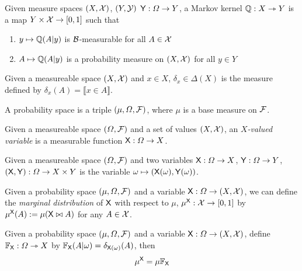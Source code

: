 \begin{definition}
Given measure spaces $(X,\mathcal{X})$, $(Y,\mathcal{Y})$ $\mathsf{Y}:\Omega\to Y$, a Markov kernel $\mathbb{Q}:X\rightarrowtriangle Y$ is a map $Y\times \mathcal{X}\to [0,1]$ such that
\begin{enumerate}
	\item $y\mapsto \mathbb{Q}(A|y)$ is $\mathcal{B}$-measurable for all $A\in \mathcal{X}$
	\item $A\mapsto \mathbb{Q}(A|y)$ is a probability measure on $(X,\mathcal{X})$ for all $y\in Y$
\end{enumerate}
\end{definition}

\begin{definition}
Given a measureable space $(X,\mathcal{X})$ and $x\in X$, $\delta_x\in \Delta(X)$ is the measure defined by $\delta_x(A)=\llbracket x\in A \rrbracket$.
\end{definition}

\begin{definition}
A probability space is a triple $(\mu,\Omega,\mathcal{F})$, where $\mu$ is a base measure on $\mathcal{F}$.
\end{definition}

\begin{definition}[Variable]
Given a measureable space $(\Omega,\mathcal{F})$ and a set of values $(X,\mathcal{X})$, an \emph{$X$-valued variable} is a measurable function $\mathsf{X}:\Omega\to X$.
\end{definition}

\begin{definition}
Given a measureable space $(\Omega,\mathcal{F})$ and two variables $\mathsf{X}:\Omega\to X$, $\mathsf{Y}:\Omega\to Y$, $(\mathsf{X},\mathsf{Y}):\Omega\to X\times Y$ is the variable $\omega\mapsto (\mathsf{X}(\omega),\mathsf{Y}(\omega))$.
\end{definition}

\begin{definition}\label{def:pushforward}
Given a probability space $(\mu,\Omega,\mathcal{F})$ and a variable $\mathsf{X}:\Omega\to (X,\mathcal{X})$, we can define the \emph{marginal distribution} of $\mathsf{X}$ with respect to $\mu$, $\mu^{\mathsf{X}}:\mathcal{X}\to [0,1]$ by $\mu^{\mathsf{X}}(A):=\mu(\mathsf{X}\bowtie A)$ for any $A\in \mathcal{X}$.
\end{definition}

\begin{lemma}\label{lem:pushf_kprod}
Given a probability space $(\mu,\Omega,\mathcal{F})$ and a variable $\mathsf{X}:\Omega\to (X,\mathcal{X})$, define $\mathbb{F}_{\mathsf{X}}:\Omega\rightarrowtriangle X$ by $\mathbb{F}_{\mathsf{X}}(A|\omega)=\delta_{\mathsf{X}(\omega)}(A)$, then
\begin{align}
	\mu^{\mathsf{X}} = \mu\mathbb{F}_{\mathsf{X}}
\end{align}
\end{lemma}

